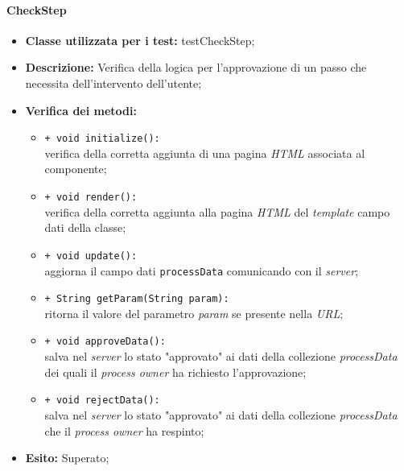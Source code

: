 \paragraph{CheckStep}
\begin{flushleft}
\begin{itemize}
\item \textbf{Classe utilizzata per i test:} testCheckStep;
\item \textbf{Descrizione:} Verifica della logica per l'approvazione di un passo che necessita dell'intervento dell'utente;
\item \textbf{Verifica dei metodi:}
\begin{sloppypar}
\begin{itemize}
\item \texttt{+ void initialize():}\\ verifica della corretta aggiunta di una pagina \textit{HTML} associata al componente;
\item \texttt{+ void render():}\\ verifica della corretta aggiunta alla pagina \textit{HTML} del \textit{template} campo dati della classe;
\item \texttt{+ void update():}\\ aggiorna il campo dati \texttt{processData} comunicando con il \textit{server};
\item \texttt{+ String getParam(String param):}\\ ritorna il valore del parametro \textit{param} se presente nella \textit{URL};
\item \texttt{+ void approveData():}\\ salva nel \textit{server} lo stato "approvato" ai dati della collezione \textit{processData} dei quali il \textit{process owner} ha richiesto l'approvazione;
\item \texttt{+ void rejectData():}\\ salva nel \textit{server} lo stato "approvato" ai dati della collezione \textit{processData} che il \textit{process owner} ha respinto;
\end{itemize}
\end{sloppypar}
\item \textbf{Esito:} Superato;
\end{itemize}
\end{flushleft}